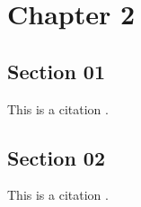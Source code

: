 \chapter{Chapter 2}
\lipsum[1-3]
\section{Section 01}
This is a citation \cite{grand}.
\lipsum[2-5]

\section{Section 02}
This is a citation \cite{grand}.
\lipsum[2-3]